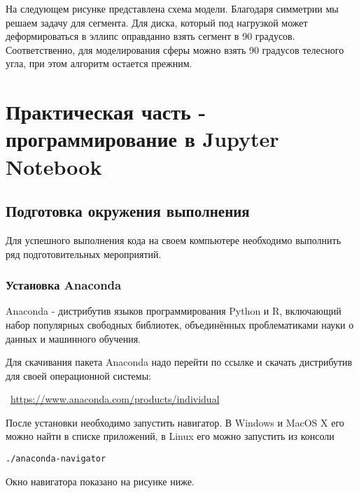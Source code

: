 \documentclass[11pt]{article}
\begin{document}
На следующем рисунке представлена схема модели.
Благодаря симметрии мы решаем задачу для сегмента. Для диска, который под нагрузкой может деформироваться в эллипс оправданно взять сегмент в 90 градусов. Соответственно, для моделирования сферы можно взять 90 градусов телесного угла, при этом алгоритм остается прежним.

    \begin{center}
    \end{center}

\section{Практическая часть - программирование в Jupyter Notebook}
    \subsection{Подготовка окружения выполнения}
Для успешного выполнения кода на своем компьютере необходимо выполнить ряд подготовительных мероприятий.

\subsubsection{Установка Anaconda}
Anaconda - дистрибутив языков программирования Python и R, включающий набор популярных свободных библиотек, объединённых проблематиками науки о данных и машинного обучения.

Для скачивания пакета Anaconda надо перейти по ссылке и скачать дистрибутив для своей операционной системы:

~\url{https://www.anaconda.com/products/individual}

    \begin{center}
    \end{center}

После установки необходимо запустить навигатор. В Windows и MacOS X его можно найти в списке приложений, в Linux его можно запустить  из консоли 
    \begin{Verbatim}[commandchars=\\\{\}]
./anaconda-navigator
    \end{Verbatim}
     
Окно навигатора показано на рисунке ниже.
    \begin{center}
    \end{center}
\end{document}
